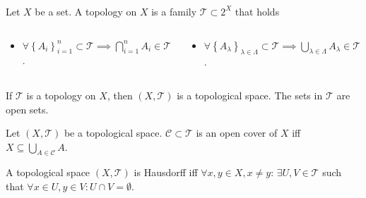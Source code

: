 \begin{frame}
	\frametitle{\secname}

	\begin{definition}
		Let $X$ be a set.
		A \alert{topology} on $X$ is a family $\mathcal{T}\subset 2^{X}$
		that holds

		\begin{columns}
			\begin{column}{0.48\textwidth}
				\begin{itemize}
					\item

					      \begin{math}
						      \forall\left\{A_{i}\right\}_{i=1}^{n}\subset
						      \mathcal{T}\implies
						      \bigcap\limits_{i=1}^{n}
						      A_{i}\in\mathcal{T}
					      \end{math}.
				\end{itemize}
			\end{column}
			\begin{column}{0.48\textwidth}
				\begin{itemize}
					\item

					      \begin{math}
						      \forall
						      \left\{
						      A_{\lambda}
						      \right\}_{\lambda\in\Lambda}\subset
						      \mathcal{T}\implies
						      \bigcup\limits_{\lambda\in\Lambda}
						      A_{\lambda}\in\mathcal{T}
					      \end{math}.
				\end{itemize}
			\end{column}
		\end{columns}

		If $\mathcal{T}$ is a topology on $X$, then
		$\left(X,\mathcal{T}\right)$ is a \alert{topological space}.
		The sets in $\mathcal{T}$ are \alert{open sets}.
	\end{definition}

	\begin{definition}
		Let $\left(X,\mathcal{T}\right)$ be a topological space.
		$\mathcal{C}\subset\mathcal{T}$ is an \alert{open cover}
		of $X$ iff
		\begin{math}
			X\subseteq\bigcup\limits_{A\in\mathcal{C}}A
		\end{math}.
	\end{definition}

	\begin{definition}
		A topological space $\left(X,\mathcal{T}\right)$ is
		\alert{Hausdorff} iff $\forall x,y\in X,x\neq y$:
		$\exists U,V\in\mathcal{T}$ such that
		\begin{math}
			\forall x\in U, y\in V:
			U\cap V=\emptyset
		\end{math}.
	\end{definition}


\end{frame}
